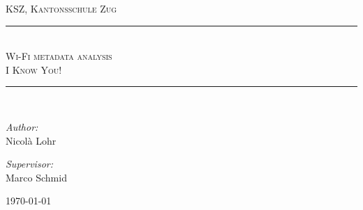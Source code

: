 
\newcommand{\HRule}{\rule{\linewidth}{0.5mm}}

\begin{center}


\textsc{\Large  KSZ, Kantonsschule Zug}\\[0.8cm]

\vfill

\HRule \\[1.8cm]
\textsc{\Large  Wi-Fi metadata analysis}\\[0.8cm]
\textsc{ \huge  I Know You!}\\[1.4cm]

\HRule \\[1.5cm]

\begin{minipage}[t]{0.38\textwidth}
\begin{flushleft} \large
\emph{Author:}\\
Nicolà Lohr \\ 


\end{flushleft}
\end{minipage}
\begin{minipage}[t]{0.6\textwidth}
\begin{flushright} \large
\emph{Supervisor:}\\
Marco Schmid
\end{flushright}
\end{minipage}

\vfill

{\large \today}

\end{center}
\thispagestyle{empty}
\newpage